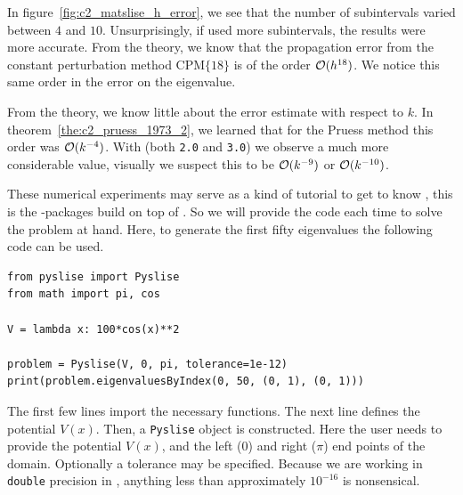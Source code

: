 In figure~\ref{fig:c2_matslise_h_error}, we see that the number of subintervals varied between $4$ and $10$. Unsurprisingly, if \matslise{} used more subintervals, the results were more accurate. From the theory, we know that the propagation error from the constant perturbation method $\text{CPM}\{18\}$ is of the order $\operatorname{\mathcal{O}}(h^{18})$. We notice this same order in the error on the eigenvalue.

From the theory, we know little about the error estimate with respect to $k$. In theorem~\ref{the:c2_pruess_1973_2}, we learned that for the Pruess method this order was $\operatorname{\mathcal{O}}(k^{-4})$. With \matslise{} (both \texttt{2.0} and \texttt{3.0}) we observe a much more considerable value, visually we suspect this to be $\operatorname{\mathcal{O}}(k^{-9})$ or $\operatorname{\mathcal{O}}(k^{-10})$.

These numerical experiments may serve as a kind of tutorial to get to know \pyslise{}, this is the \lpython{}-packages build on top of . So we will provide the code each time to solve the problem at hand. Here, to generate the first fifty eigenvalues the following code can be used.
\begin{verbatim}
from pyslise import Pyslise
from math import pi, cos

V = lambda x: 100*cos(x)**2

problem = Pyslise(V, 0, pi, tolerance=1e-12)
print(problem.eigenvaluesByIndex(0, 50, (0, 1), (0, 1)))
\end{verbatim}

The first few lines import the necessary functions. The next line defines the potential $V(x)$. Then, a \texttt{Pyslise} object is constructed. Here the user needs to provide the potential $V(x)$, and the left ($0$) and right ($\pi$) end points of the domain. Optionally a tolerance may be specified. Because we are working in \texttt{double} precision in \lpython{}, anything less than approximately $10^{-16}$ is nonsensical.

